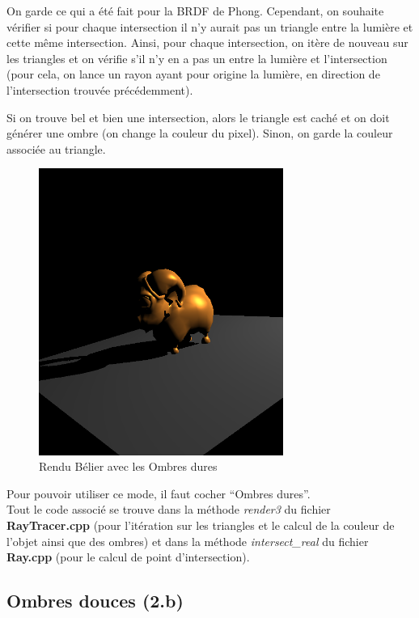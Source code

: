 \documentclass[a4paper,11pt,titlepage]{article}
\begin{document}
On garde ce qui a été fait pour la BRDF de Phong. Cependant, on souhaite vérifier si pour chaque intersection il n'y aurait pas un triangle entre la lumière et cette même intersection. Ainsi, pour chaque intersection, on itère de nouveau sur les triangles et on vérifie s'il n'y en a pas un entre la lumière et l'intersection (pour cela, on lance un rayon ayant pour origine la lumière, en direction de l'intersection trouvée précédemment).

Si on trouve bel et bien une intersection, alors le triangle est caché et on doit générer une ombre (on change la couleur du pixel). Sinon, on garde la couleur associée au triangle.\\

\begin{figure}[H]
 \begin{center}
 \includegraphics[width=8cm]{Rendu/OmbresD.png}
 \end{center}

 \caption{Rendu Bélier avec les Ombres dures}
 \label{rendu3}
\end{figure}

Pour pouvoir utiliser ce mode, il faut cocher ``Ombres dures''.\\

Tout le code associé se trouve dans la méthode \textit{render3} du fichier \textbf{RayTracer.cpp} (pour l'itération sur les triangles et le calcul de la couleur de l'objet ainsi que des ombres) et dans la méthode \textit{intersect\_real} du fichier \textbf{Ray.cpp} (pour le calcul de point d'intersection).


\subsection{Ombres douces (2.b)}
\end{document}
